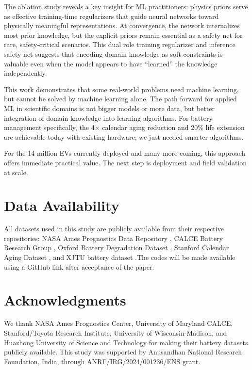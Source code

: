\documentclass[5p,times,authoryear]{elsarticle}
\begin{document}
The ablation study reveals a key insight for ML practitioners: physics priors serve as effective training-time regularizers that guide neural networks toward physically meaningful representations. At convergence, the network internalizes most prior knowledge, but the explicit priors remain essential as a safety net for rare, safety-critical scenarios. This dual role training regularizer and inference safety net suggests that encoding domain knowledge as soft constraints is valuable even when the model appears to have ``learned'' the knowledge independently.

This work demonstrates that some real-world problems need machine learning, but cannot be solved by machine learning alone. The path forward for applied ML in scientific domains is not bigger models or more data, but better integration of domain knowledge into learning algorithms. For battery management specifically, the 4$\times$ calendar aging reduction and 20\% life extension are achievable today with existing hardware; we just needed smarter algorithms.

For the 14 million EVs currently deployed and many more coming, this approach offers immediate practical value. The next step is deployment and field validation at scale.

\section*{Data Availability}
All datasets used in this study are publicly available from their respective repositories: NASA Ames Prognostics Data Repository \citep{saha2007battery}, CALCE Battery Research Group \citep{he2011prognostics}, Oxford Battery Degradation Dataset \citep{birkl2017oxford}, Stanford Calendar Aging Dataset \citep{schimpe2018comprehensive}, and XJTU battery dataset \citep{wang2024pinn}.The codes will be made available using a GitHub link after acceptance of the paper.

\section*{Acknowledgments}

We thank NASA Ames Prognostics Center, University of Maryland CALCE, Stanford/Toyota Research Institute, University of Wisconsin-Madison, and Huazhong University of Science and Technology for making their battery datasets publicly available. This study was supported by Anusandhan National Research Foundation, India, through ANRF/IRG/2024/001236/ENS grant.


\end{document}

